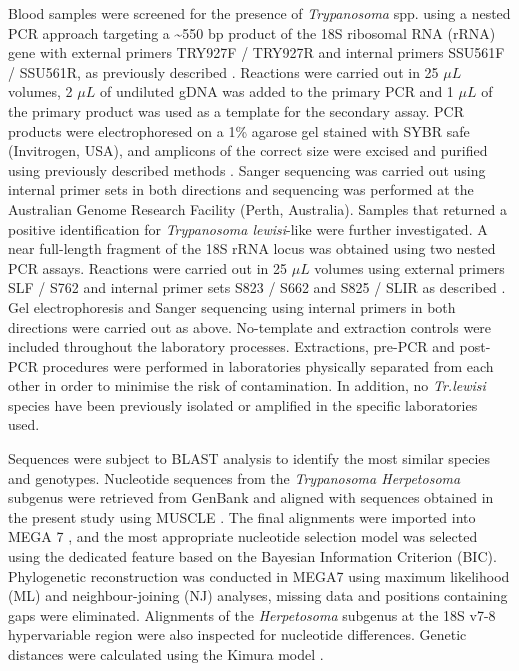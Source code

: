 \documentclass[a4paper, nobind]{templates/ociamthesis}
\begin{document}
Blood samples were screened for the presence of \emph{Trypanosoma} spp. using a nested PCR approach targeting a \textasciitilde550 bp product of the 18S ribosomal RNA (rRNA) gene with external primers TRY927F / TRY927R and internal primers SSU561F / SSU561R, as previously described \autocite{noyesNestedPCRSsrRNA1999}. Reactions were carried out in 25 \(\mu L\) volumes, 2 \(\mu L\) of undiluted gDNA was added to the primary PCR and 1 \(\mu L\) of the primary product was used as a template for the secondary assay. PCR products were electrophoresed on a 1\% agarose gel stained with SYBR safe (Invitrogen, USA), and amplicons of the correct size were excised and purified using previously described methods \autocite{yangSpecificQuantitativeDetection2013}. Sanger sequencing was carried out using internal primer sets in both directions and sequencing was performed at the Australian Genome Research Facility (Perth, Australia). Samples that returned a positive identification for \emph{Trypanosoma lewisi}-like were further investigated. A near full-length fragment of the 18S rRNA locus was obtained using two nested PCR assays. Reactions were carried out in 25 \(\mu L\) volumes using external primers SLF / S762 and internal primer sets S823 / S662 and S825 / SLIR as described \autocite{mcinnesTrypanosomaIrwiniSp2009}. Gel electrophoresis and Sanger sequencing using internal primers in both directions were carried out as above. No-template and extraction controls were included throughout the laboratory processes. Extractions, pre-PCR and post-PCR procedures were performed in laboratories physically separated from each other in order to minimise the risk of contamination. In addition, no \emph{Tr.lewisi} species have been previously isolated or amplified in the specific laboratories used.

Sequences were subject to BLAST analysis to identify the most similar species and genotypes. Nucleotide sequences from the \emph{Trypanosoma Herpetosoma} subgenus were retrieved from GenBank \autocite{bensonGenBank2017} and aligned with sequences obtained in the present study using MUSCLE \autocite{edgarMUSCLEMultipleSequence2004}. The final alignments were imported into MEGA 7 \autocite{kumarMEGA7MolecularEvolutionary2016}, and the most appropriate nucleotide selection model was selected using the dedicated feature based on the Bayesian Information Criterion (BIC). Phylogenetic reconstruction was conducted in MEGA7 using maximum likelihood (ML) and neighbour-joining (NJ) analyses, missing data and positions containing gaps were eliminated. Alignments of the \emph{Herpetosoma} subgenus at the 18S v7-8 hypervariable region were also inspected for nucleotide differences. Genetic distances were calculated using the Kimura model \autocite{edgarMUSCLEMultipleSequence2004}.
\end{document}
